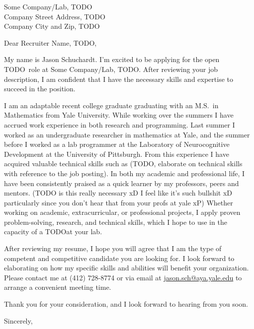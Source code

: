 \documentclass[12pt]{letter} %
\newcommand{\email}[1]{\href{mailto:#1}{#1}}
\newcommand{\companyname}{Some Company/Lab, TODO}
\newcommand{\companyinfo}{\companyname \\ Company Street Address, TODO \\ Company City and Zip, TODO}
\newcommand{\recruitername}{Recruiter Name, TODO}
\newcommand{\positionname}{TODO}
\begin{document}
\begin{letter}{}
\companyinfo

\opening{Dear \recruitername,}

My name is Jason Schuchardt. I'm excited to be applying for the open \positionname\ role at \companyname.
After reviewing your job description, I am confident that I have the necessary skills and expertise to 
succeed in the position. 

I am an adaptable recent college graduate graduating with an M.S.\ in Mathematics from Yale University.
While working over the summers I have accrued work experience in both research and programming.
Last summer I worked
as an undergraduate researcher in mathematics at Yale,
and the summer before I worked as a lab programmer at the 
Laboratory of Neurocognitive Development at the University of Pittsburgh. From this experience I have
acquired valuable technical skills such as (TODO, elaborate on technical skills with reference to the job
posting). In both my academic and professional life, I have been consistently praised as a quick learner by
my professors, peers and mentors.
(TODO is this really necessary xD I feel like it's such bullshit xD particularly
since you don't hear that from your profs at yale xP) 
Whether working on academic, extracurricular, or professional projects, I apply proven problem-solving, 
research, and technical skills, which I hope to use in the capacity of a \positionname at your lab. %

After reviewing my resume, I hope you will agree that I am the type of competent and competitive candidate 
you are looking for. I look forward to elaborating on how my specific skills and abilities will benefit your
organization. Please contact me at (412) 728-8774 or via email at 
\email{jason.sch@aya.yale.edu} to arrange a convenient meeting time.

Thank you for your consideration, and I look forward to hearing from you soon.

\closing{Sincerely,}
\end{letter}
\end{document}
